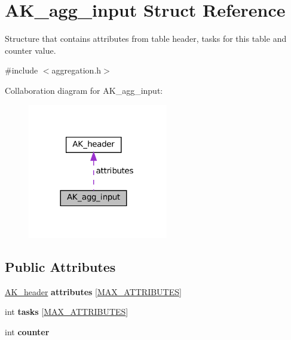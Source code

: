\hypertarget{structAK__agg__input}{}\section{A\+K\+\_\+agg\+\_\+input Struct Reference}
\label{structAK__agg__input}


Structure that contains attributes from table header, tasks for this table and counter value.  




{\ttfamily \#include $<$aggregation.\+h$>$}



Collaboration diagram for A\+K\+\_\+agg\+\_\+input\+:\nopagebreak
\begin{figure}[H]
\begin{center}
\leavevmode
\includegraphics[width=173pt]{structAK__agg__input__coll__graph}
\end{center}
\end{figure}
\subsection*{Public Attributes}
\begin{DoxyCompactItemize}
\item 
\mbox{\label{structAK__agg__input_a932027458b8c435e69f36ba37fc9de0c}} 
\hyperlink{structAK__header}{A\+K\+\_\+header} {\bfseries attributes} \mbox{[}\hyperlink{constants_8h_a4d992a1f9192388588184753115f6c03}{M\+A\+X\+\_\+\+A\+T\+T\+R\+I\+B\+U\+T\+ES}\mbox{]}
\item 
\mbox{\label{structAK__agg__input_af82e95204d38317274d58ef54c11f19b}} 
int {\bfseries tasks} \mbox{[}\hyperlink{constants_8h_a4d992a1f9192388588184753115f6c03}{M\+A\+X\+\_\+\+A\+T\+T\+R\+I\+B\+U\+T\+ES}\mbox{]}
\item 
\mbox{\label{structAK__agg__input_a008ffea3c7974da90b1176c63874ad5b}} 
int {\bfseries counter}
\end{DoxyCompactItemize}


